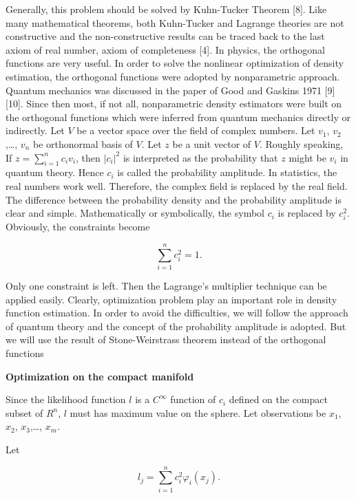 \documentclass [18pt]{article}
\begin{document}
Generally, this problem should be solved by Kuhn-Tucker Theorem [8]. Like
many mathematical theorems, both Kuhn-Tucker and Lagrange theories are not
constructive and the non-constructive results can be traced back to the last
axiom of real number, axiom of completeness [4]. In physics, the orthogonal
functions are very useful. In order to solve the nonlinear optimization of
density estimation, the orthogonal functions were adopted by nonparametric
approach. Quantum mechanics was discussed in the paper of Good and Gaskins
1971 [9] [10]. Since then most, if not all, nonparametric density estimators
were built on the orthogonal functions which were inferred from quantum
mechanics directly or indirectly. Let $V$ be a vector space over the field
of complex numbers. Let $v_1 $, $v_2 $,\ldots , $v_n $ be orthonormal basis
of $V$. Let $z$ be a unit vector of $V$. Roughly speaking, If $z =
\sum\limits_{i = 1}^n {c_i v_i } $, then $\left| {c_i } \right|^2$ is
interpreted as the probability that $z$ might be $v_i $ in quantum theory.
Hence $c_i $ is called the probability amplitude. In statistics, the real
numbers work well. Therefore, the complex field is replaced by the real
field. The difference between the probability density and the probability
amplitude is clear and simple. Mathematically or symbolically, the symbol
$c_i $ is replaced by $c_i^2 $. Obviously, the constraints become


\begin{equation}
\label{eq16}
\sum\limits_{i = 1}^n {c_i^2 = 1} .
\end{equation}



Only one constraint is left. Then the Lagrange's multiplier technique can be
applied easily. Clearly, optimization problem play an important role in
density function estimation. In order to avoid the difficulties, we will
follow the approach of quantum theory and the concept of the probability
amplitude is adopted. But we will use the result of Stone-Weirstrass theorem
instead of the orthogonal functions

\textbf{Optimization on the compact manifold}

Since the likelihood function $l$ is a $C^\infty $ function of $c_i $
defined on the compact subset of $R^n$, $l$ must has maximum value on the
sphere. Let observations be $x_1 $, $x_2 $, $x_3 $,\ldots , $x_m $.

Let


\begin{equation}
\label{eq17}
l_j = \sum\limits_{i = 1}^n {c_i^2 \varphi _i (x_j )} .
\end{equation}
\end{document}
